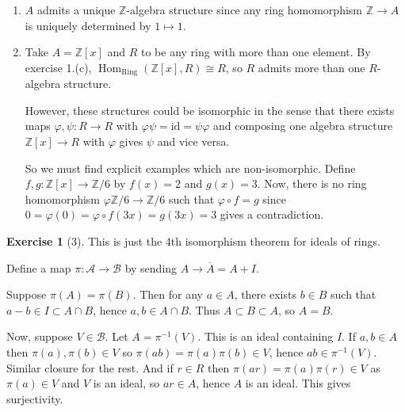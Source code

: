 \documentclass[reqno]{amsart}
\theoremstyle{definition}
\newtheorem{exercise}[theorem]{Exercise}
\theoremstyle{remark}
\DeclareMathOperator{\Hom}{Hom}
\DeclareMathOperator{\Ring}{Ring}
\newcommand{\id}{{\mathrm{id}}}
\begin{document}
    \begin{enumerate}
        \item $A$ admits a unique $\mathbb{Z}$-algebra
            structure since any ring homomorphism
            $\mathbb{Z} \to A$ is uniquely determined
            by $1 \mapsto 1$.
        \item Take $A = \mathbb{Z}[x]$ and
            $R$ to be any ring with more
            than one element. By exercise 1.(c),
            $\Hom_{\Ring}\left( \mathbb{Z}[x],
            R\right) \cong R$, so
            $R$ admits more than one
            $R$-algebra structure.

            However, these structures could be isomorphic
            in the sense that there
            exists maps $\varphi , \psi  \colon
            R \to R$ with $\varphi \psi = \id = \psi  \varphi $ 
            and composing one algebra structure
            $\mathbb{Z}[x] \to R$ with $\varphi $ gives
            $\psi $ and vice versa. 

            So we must find explicit examples which
            are non-isomorphic. 
            Define 
            $f,g \colon \mathbb{Z}[x] \to \mathbb{Z}/6$ by
            $f(x) = 2$ and
            $g(x) = 3$. Now, there
            is no ring homomorphism
            $\varphi \mathbb{Z} / 6 \to \mathbb{Z}/6$
            such that $\varphi \circ f = g$ since
            $0 = \varphi (0) =\varphi \circ f(3x) = g(3x)
            = 3$ gives a contradiction.
    \end{enumerate}


\begin{exercise}[3]
    This is just the 4th isomorphism theorem
    for ideals of rings.

    Define a map
    $\pi \colon \mathcal{A} \to \mathcal{B}$ by
    sending $A \to \overline{A} = A + I$.

    Suppose $\pi(A) = \pi(B)$. Then
    for any $a \in A$, there exists $b \in B$ such that
    $a-b \in I \subset A \cap B$, hence
    $a,b \in A \cap B$. Thus $A \subset B \subset A$, so
    $A = B$. 

    Now, suppose $V \in \mathcal{B}$. Let
    $A = \pi^{-1}(V)$. This is an ideal containing $I$.
    If $a,b \in A$ then $\pi(a), \pi(b) \in V$ so
    $\pi(ab) = \pi(a) \pi(b) \in V$, hence
    $ab \in \pi^{-1}(V)$. Similar closure for the rest.
    And if $r \in R$ then
    $\pi\left( ar \right) =\pi(a) \pi(r) \in V$ as
    $\pi(a) \in V$ and $V$ is an ideal, so
    $ar \in A$, hence $A$ is an ideal. This gives surjectivity.
\end{exercise}
\end{document}
